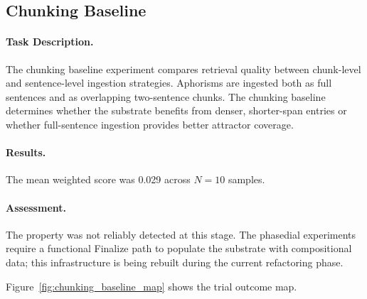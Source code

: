 \subsection{Chunking Baseline}
\label{sec:chunking_baseline}

\paragraph{Task Description.}
The chunking baseline experiment compares retrieval quality between chunk-level and sentence-level
ingestion strategies.  Aphorisms are ingested both as full sentences
and as overlapping two-sentence chunks.  The chunking baseline
determines whether the substrate benefits from denser, shorter-span
entries or whether full-sentence ingestion provides better attractor
coverage.

\paragraph{Results.}
The mean weighted score was 0.029 across $N = 10$ samples.

\paragraph{Assessment.}
The property was not reliably detected at this stage.  The phasedial
experiments require a functional Finalize path to populate the substrate
with compositional data; this infrastructure is being rebuilt during
the current refactoring phase.

Figure~\ref{fig:chunking_baseline_map} shows the trial outcome map.
